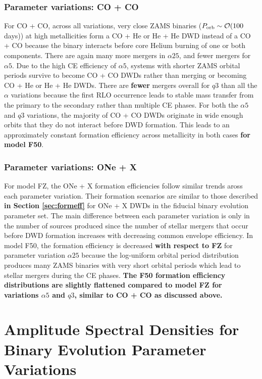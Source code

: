 \documentclass[twocolumn, linenumbers]{aastex631}
\begin{document}
\subsubsection{\textbf{Parameter variations: CO + CO}}\label{formeff_CO_vars}
For CO + CO, across all variations, very close ZAMS binaries ($P_{\rm{orb}}\sim\mathcal{O}(100$ days)) at high metallicities form a CO + He or He + He DWD instead of a CO + CO because the binary interacts before core Helium burning of one or both components. There are again many more mergers in $\alpha25$, and fewer mergers for $\alpha5$. Due to the high CE efficiency of $\alpha5$, systems with shorter ZAMS orbital periods survive to become CO + CO DWDs rather than merging or becoming CO + He or He + He DWDs. There are \textbf{fewer} mergers overall for $q3$ than all the $\alpha$ variations because the first RLO occurrence leads to stable mass transfer from the primary to the secondary rather than multiple CE phases. For both the $\alpha5$ and $q3$ variations, the majority of CO + CO DWDs originate in wide enough orbits that they do not interact before DWD formation. This leads to an approximately constant formation efficiency across metallicity in both cases \textbf{for model F50}.

\subsubsection{\textbf{Parameter variations: ONe + X}}\label{formeff_ONe_vars}
For model FZ, the ONe + X formation efficiencies follow similar trends aross each parameter variation. Their formation scenarios are similar to those described \textbf{in Section \ref{sec:formeff}} for ONe + X DWDs in the fiducial binary evolution parameter set. The main difference between each parameter variation is only in the number of sources produced since the number of stellar mergers that occur before DWD formation increases with decreasing common envelope efficiency. In model F50, the formation efficiency is decreased \textbf{with respect to FZ} for parameter variation $\alpha25$ because the log-uniform orbital period distribution produces many ZAMS binaries with very short orbital periods which lead to stellar mergers during the CE phases. \textbf{The F50 formation efficiency distributions are slightly flattened compared to model FZ for variations $\alpha5$ and $q3$, similar to CO + CO as discussed above.}


\section{Amplitude Spectral Densities for Binary Evolution Parameter Variations}\label{appendix:ASD_vars}
\end{document}
